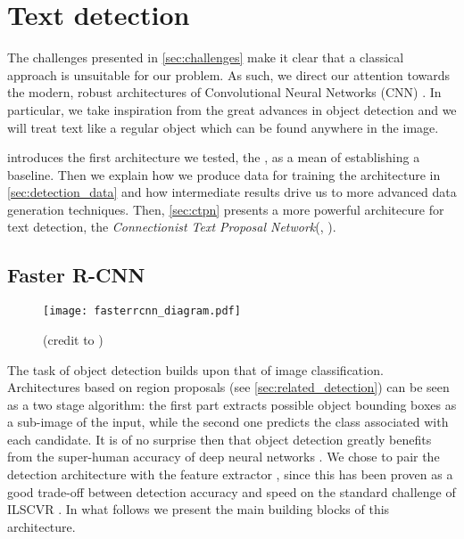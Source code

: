 \chapter{Text detection}
\label{ch:detection}

The challenges presented in \autoref{sec:challenges} make it clear that a classical approach is unsuitable for our problem. As such, we direct our attention towards the modern, robust architectures of Convolutional Neural Networks (CNN) \citep{leCun_CNN}. In particular, we take inspiration from the great advances in object detection and we will treat text like a regular object which can be found anywhere in the image.

 introduces the first architecture we tested, the \FRCNN{} \citep{faster_rcnn}, as a mean of establishing a baseline. Then we explain how we produce data for training the architecture in \autoref{sec:detection_data} and how intermediate results drive us to more advanced data generation techniques. Then, \autoref{sec:ctpn} presents a more powerful architecure for text detection, the \emph{Connectionist Text Proposal Network}(\CTPN{}, \citet{ctpn}). 



\section{Faster R-CNN}\label{sec:faster_rcnn}

	\begin{figure}
		\centering
		\texttt{[image: fasterrcnn\_diagram.pdf]}
		\caption[The \FRCNN{} architecture]{(credit to \cite{detection_benchmark}) \label{fig:faster_rcnn}}
	\end{figure}

	The task of object detection builds upon that of image classification. Architectures based on region proposals (see \autoref{sec:related_detection}) can be seen as a two stage algorithm: the first part extracts possible object bounding boxes as a sub-image of the input, while the second one predicts the class associated with each candidate. It is of no surprise then that object detection greatly benefits from the super-human accuracy of deep neural networks \citep{superhuman_classif}. We chose to pair the \FRCNN{} detection architecture with the \RESNET{} feature extractor \citep{resnet}, since this has been proven as a good trade-off between detection accuracy and speed on the standard challenge of ILSCVR \citep{detection_benchmark}. In what follows we present the main building blocks of this architecture.

